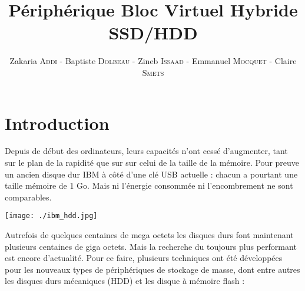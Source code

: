 \documentclass[a4paper,10pt]{article}
\title{Périphérique Bloc Virtuel Hybride SSD/HDD}
\author{Zakaria {\scshape{Addi}} - Baptiste {\scshape{Dolbeau}} - Zineb {\scshape{Issaad}} - Emmanuel {\scshape{Mocquet}} - Claire {\scshape{Smets}}}
\begin{document}
\maketitle

\clearpage
\tableofcontents
\clearpage

\pagebreak
\section{Introduction}
\begin{minipage}{0.55\linewidth}
Depuis de début des ordinateurs, leurs capacités n'ont cessé d'augmenter, tant sur le plan de la rapidité que sur sur celui de la taille de la mémoire. Pour 
preuve un ancien disque dur IBM à côté d'une clé USB actuelle : chacun a pourtant une taille mémoire de 1 Go. Mais ni l'énergie consommée ni l'encombrement 
ne sont comparables.\\
\end{minipage}\hfill
\begin{minipage}{0.4\linewidth}
\texttt{[image: ./ibm\_hdd.jpg]}
\end{minipage}
Autrefois de quelques centaines de mega octets les disques durs font maintenant plusieurs centaines de giga octets. Mais la recherche du toujours plus 
performant est encore d'actualité. Pour ce faire, plusieurs techniques ont été développées pour les nouveaux types de périphériques de stockage de masse, 
dont entre autres les disques durs mécaniques (HDD) et les disque à mémoire flash : \bigskip\\
\end{document}
